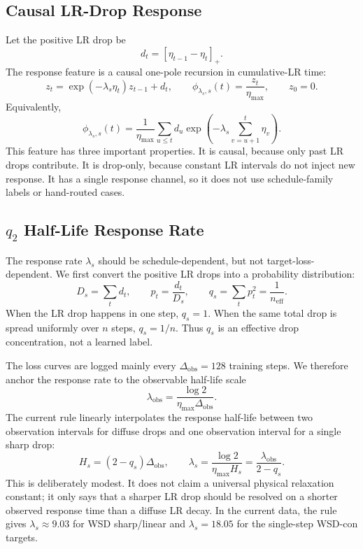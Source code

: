 \documentclass{article}
\newcommand{\obs}{\mathrm{obs}}
\begin{document}
\subsection{Causal LR-Drop Response}
Let the positive LR drop be
\begin{equation}\label{eq:drop}
  d_t=[\eta_{t-1}-\eta_t]_+ .
\end{equation}
The response feature is a causal one-pole recursion in cumulative-LR time:
\begin{equation}\label{eq:feature_recursion}
  z_t=\exp(-\lambda_s\eta_t)z_{t-1}+d_t,\qquad
  \phi_{\lambda_s,s}(t)=\frac{z_t}{\eta_{\max}},\qquad z_0=0 .
\end{equation}
Equivalently,
\begin{equation}\label{eq:feature_sum}
  \phi_{\lambda_s,s}(t)
  =
  \frac{1}{\eta_{\max}}
  \sum_{u\le t} d_u
  \exp\!\left(-\lambda_s\sum_{v=u+1}^{t}\eta_v\right).
\end{equation}
This feature has three important properties.  It is causal, because only past LR drops
contribute.  It is drop-only, because constant LR intervals do not inject new response.  It
has a single response channel, so it does not use schedule-family labels or hand-routed
cases.

\subsection[q2 Half-Life Response Rate]{\(q_2\) Half-Life Response Rate}
The response rate \(\lambda_s\) should be schedule-dependent, but not target-loss-dependent.
We first convert the positive LR drops into a probability distribution:
\begin{equation}\label{eq:q2_def}
  D_s=\sum_t d_t,\qquad
  p_t=\frac{d_t}{D_s},\qquad
  q_s=\sum_t p_t^2=\frac{1}{n_{\mathrm{eff}}}.
\end{equation}
When the LR drop happens in one step, \(q_s=1\).  When the same total drop is spread
uniformly over \(n\) steps, \(q_s=1/n\).  Thus \(q_s\) is an effective drop concentration,
not a learned label.

The loss curves are logged mainly every \(\Delta_{\obs}=128\) training steps.  We therefore
anchor the response rate to the observable half-life scale
\begin{equation}\label{eq:lambda_obs}
  \lambda_{\obs}
  =
  \frac{\log 2}{\eta_{\max}\Delta_{\obs}} .
\end{equation}
The current rule linearly interpolates the response half-life between two observation
intervals for diffuse drops and one observation interval for a single sharp drop:
\begin{equation}\label{eq:q2_halflife}
  H_s=(2-q_s)\Delta_{\obs},\qquad
  \lambda_s=\frac{\log 2}{\eta_{\max}H_s}
  =\frac{\lambda_{\obs}}{2-q_s}.
\end{equation}
This is deliberately modest.  It does not claim a universal physical relaxation constant; it
only says that a sharper LR drop should be resolved on a shorter observed response time than
a diffuse LR decay.  In the current data, the rule gives \(\lambda_s\approx 9.03\) for WSD
sharp/linear and \(\lambda_s=18.05\) for the single-step WSD-con targets.
\end{document}

